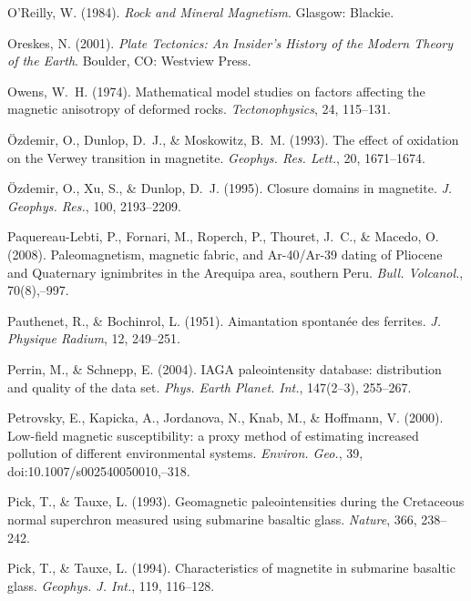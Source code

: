 \documentclass[,plain]{tauxe}
\begin{document}
\begin{thebibliography}{}
\bibitem{}%
O'Reilly, W. (1984).
{\it Rock and Mineral Magnetism}. Glasgow:
Blackie.

\bibitem{}%
Oreskes, N. (2001).
{\it Plate Tectonics: An Insider's History of the Modern Theory of the Earth}.
Boulder, CO: Westview Press.

\bibitem{}%
Owens, W.~H. (1974).
Mathematical model studies on factors affecting the magnetic anisotropy of deformed rocks.
{\it Tectonophysics}, 24, 115--131.

\bibitem{}%
\"Ozdemir, O., Dunlop, D.~J., \& Moskowitz, B.~M. (1993).
The effect of oxidation on the Verwey transition in magnetite.
{\it Geophys. Res. Lett.}, 20, 1671--1674.

\bibitem{}%
\"Ozdemir, O., Xu, S., \& Dunlop, D.~J. (1995).
Closure domains in magnetite.
{\it J. Geophys. Res.}, 100, 2193--2209.

\bibitem{}%
Paquereau-Lebti, P., Fornari, M., Roperch, P., Thouret, J.~C., \& Macedo, O. (2008).
Paleomagnetism, magnetic fabric, and Ar-40/Ar-39 dating of Pliocene and Quaternary ignimbrites in the Arequipa area, southern Peru.
{\it Bull. Volcanol.}, 70(8),--997.

\bibitem{}%
Pauthenet, R., \& Bochinrol, L. (1951).
Aimantation spontan\'ee des ferrites.
{\it J. Physique Radium}, 12, 249--251.

\bibitem{}%
Perrin, M., \& Schnepp, E. (2004).
IAGA paleointensity database: distribution and quality of the data set.
{\it Phys. Earth Planet. Int.}, 147(2--3), 255--267.

\bibitem{}%
Petrovsky, E., Kapicka, A., Jordanova, N., Knab, M., \& Hoffmann, V. (2000).\break
Low-field magnetic susceptibility: a proxy method of estimating increased pollution of different environmental systems.
{\it Environ. Geo.}, 39, doi:10.1007/s002540050010,--318.

\bibitem{}%
Pick, T., \& Tauxe, L. (1993).
Geomagnetic paleointensities during the Cretaceous normal superchron measured using submarine basaltic glass.
{\it Nature}, 366, 238--242.

\bibitem{}%
Pick, T., \& Tauxe, L. (1994).
Characteristics of magnetite in submarine basaltic glass.
{\it Geophys. J. Int.}, 119, 116--128.


\end{thebibliography}
\end{document}
